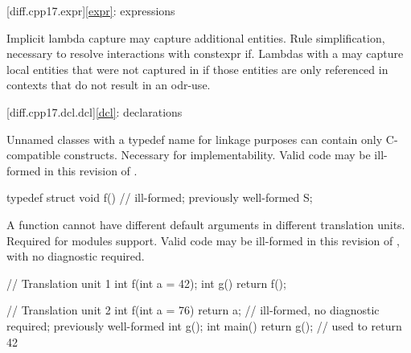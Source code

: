 [diff.cpp17.expr]{\ref*{expr}: expressions}

\change
Implicit lambda capture may capture additional entities.
\rationale
Rule simplification, necessary to resolve interactions with constexpr if.
\effect
Lambdas with a 
may capture local entities
that were not captured in \CppXVII{}
if those entities are only referenced in contexts
that do not result in an odr-use.

[diff.cpp17.dcl.dcl]{\ref*{dcl}: declarations}

\change
Unnamed classes with a typedef name for linkage purposes
can contain only C-compatible constructs.
\rationale
Necessary for implementability.
\effect
Valid \CppXVII{} code may be ill-formed in this revision of \Cpp{}.
\begin{example}
\begin{codeblock}
typedef struct {
  void f() {}           // ill-formed; previously well-formed
} S;
\end{codeblock}
\end{example}

\change
A function cannot have different default arguments
in different translation units.
\rationale
Required for modules support.
\effect
Valid \CppXVII{} code may be ill-formed in this revision of \Cpp{},
with no diagnostic required.
\begin{example}
\begin{codeblock}
// Translation unit 1
int f(int a = 42);
int g() { return f(); }

// Translation unit 2
int f(int a = 76) { return a; }         // ill-formed, no diagnostic required; previously well-formed
int g();
int main() { return g(); }              // used to return 42
\end{codeblock}
\end{example}

